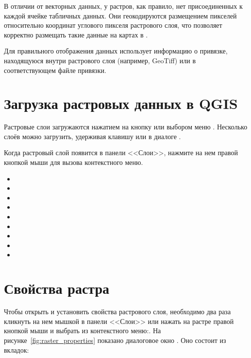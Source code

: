 В отличии от векторных данных, у растров, как правило, нет присоединенных к каждой
ячейке табличных данных. Они геокодируются размещением пикселей относительно
координат углового пикселя растрового слоя, что позволяет корректно размещать
такие данные на картах в \qg.

Для правильного отображения данных \qg использует информацию о привязке,
находящуюся внутри растрового слоя (например, GeoTiff) или в соответствующем файле
привязки.

\section{Загрузка растровых данных в QGIS}\label{label_loadraster}

Растровые слои загружаются нажатием на кнопку
 или выбором меню
 \arrow
{}.
Несколько слоёв можно загрузить, удерживая клавишу 
или  в диалоге .

Когда растровый слой появится в панели <<Слои>>, нажмите на нем правой
кнопкой мыши для вызова контекстного меню.


\begin{itemize}[label=--]
\item {}
\item {}
\item {}
\item {}
\item {}
\item {}
\item {}
\item {}
\item {}
\end{itemize}

\section{Свойства растра}\label{label_rasterprop}

Чтобы открыть и установить свойства растрового слоя, необходимо два раза
кликнуть на нем мышкой в панели <<Слои>> или нажать на растре правой
кнопкой мыши и выбрать  из контекстного
меню:. На рисунке~\ref{fig:raster_properties}
показано диалоговое окно . Оно состоит из
вкладок:

